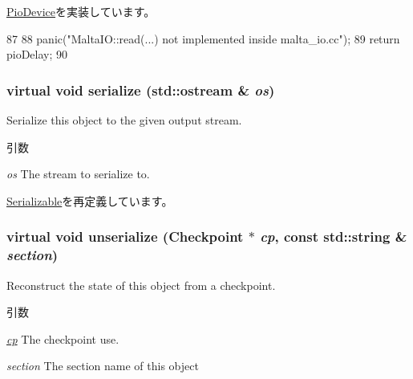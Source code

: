 \hyperlink{classPioDevice_a842312590432036092c422c87a442358}{PioDevice}を実装しています。


\begin{DoxyCode}
87 {
88     panic("MaltaIO::read(...) not implemented inside malta_io.cc");
89     return pioDelay;
90 }
\end{DoxyCode}
\hypertarget{classMaltaIO_ad6272f80ae37e8331e3969b3f072a801}{
\subsubsection[{serialize}]{\setlength{\rightskip}{0pt plus 5cm}virtual void serialize (std::ostream \& {\em os})}}
\label{classMaltaIO_ad6272f80ae37e8331e3969b3f072a801}
Serialize this object to the given output stream. 
\begin{DoxyParams}{引数}
\item[{\em os}]The stream to serialize to. \end{DoxyParams}


\hyperlink{classSerializable_ad6272f80ae37e8331e3969b3f072a801}{Serializable}を再定義しています。\hypertarget{classMaltaIO_af100c4e9feabf3cd918619c88c718387}{
\subsubsection[{unserialize}]{\setlength{\rightskip}{0pt plus 5cm}virtual void unserialize ({\bf Checkpoint} $\ast$ {\em cp}, \/  const std::string \& {\em section})}}
\label{classMaltaIO_af100c4e9feabf3cd918619c88c718387}
Reconstruct the state of this object from a checkpoint. 
\begin{DoxyParams}{引数}
\item[{\em \hyperlink{namespacecp}{cp}}]The checkpoint use. \item[{\em section}]The section name of this object \end{DoxyParams}


